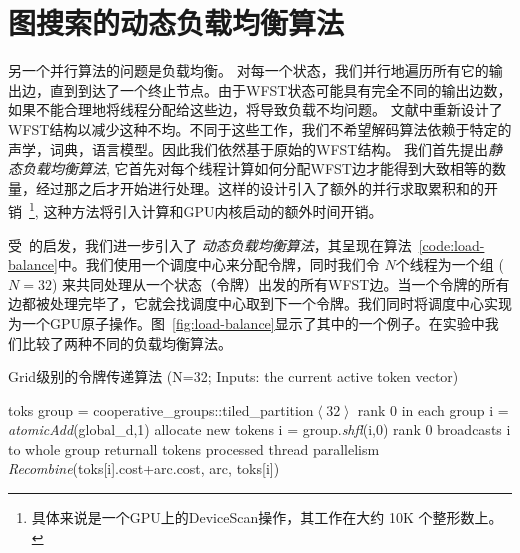 \section{图搜索的动态负载均衡算法}
\label{sec:para-viterbi}

另一个并行算法的问题是负载均衡。
对每一个状态，我们并行地遍历所有它的输出边，直到到达了一个终止节点。由于WFST状态可能具有完全不同的输出边数，如果不能合理地将线程分配给这些边，将导致负载不均问题。
文献\cite{you2009parallel,mendis2016parallelizing}中重新设计了 WFST结构以减少这种不均。不同于这些工作，我们不希望解码算法依赖于特定的声学，词典，语言模型。因此我们依然基于原始的WFST结构。
我们首先提出\textit{静态负载均衡算法}, 它首先对每个线程计算如何分配WFST边才能得到大致相等的数量，经过那之后才开始进行处理。这样的设计引入了额外的并行求取累积和的开销~\footnote{具体来说是一个GPU上的DeviceScan操作，其工作在大约 10K 个整形数上。},
这种方法将引入计算和GPU内核启动的额外时间开销。

受~\cite{alakeel2010}的启发，我们进一步引入了
\textit{动态负载均衡算法}，其呈现在算法~\ref{code:load-balance}中。我们使用一个调度中心来分配令牌，同时我们令 $N$个线程为一个组 ($N = 32$) 来共同处理从一个状态（令牌）出发的所有WFST边。当一个令牌的所有边都被处理完毕了，它就会找调度中心取到下一个令牌。我们同时将调度中心实现为一个GPU原子操作。图~\ref{fig:load-balance}显示了其中的一个例子。在实验中我们比较了两种不同的负载均衡算法。


\vspace{-0.5em}
\begin{algorithm}[ht]
\caption{Grid级别的令牌传递算法 \textcolor[rgb]{0,0.5,0}{(N=32; Inputs: the current active token vector)}}
\label{code:load-balance}
\begin{algorithmic}[1]
 {toks}
\State group = cooperative\_groups::tiled\_partition$\left<32\right>$
\Comment\textcolor[rgb]{0,0.5,0}{rank 0 in each group}
\State i = \textit{atomicAdd}(global\_d,1)  \Comment\textcolor[rgb]{0,0.5,0}{allocate new tokens}
\EndIf      %
\State i = group.\textit{shfl}(i,0) \Comment \textcolor[rgb]{0,0.5,0}{rank 0 broadcasts i to whole group}
 return\Comment \textcolor[rgb]{0,0.5,0}{all tokens processed}
\EndIf 
{} \Comment \textcolor[rgb]{0,0.5,0}{thread parallelism}
 \textit{Recombine}(toks[i].cost+arc.cost, arc, toks[i])
\EndFor
\EndProcedure
\end{algorithmic}
\end{algorithm}




